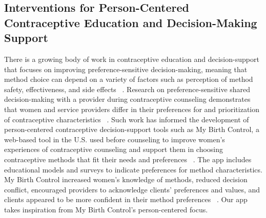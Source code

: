 \subsection{Interventions for Person-Centered Contraceptive Education and Decision-Making Support} 

There is a growing body of work in contraceptive education and decision-support that focuses on improving preference-sensitive decision-making, meaning that method choice can depend on a variety of factors such as perception of method safety, effectiveness, and side effects ~\cite{madden2015role, marshall2016young}. Research on preference-sensitive shared decision-making with a provider during contraceptive counseling demonstrates that women and service providers differ in their preferences for and prioritization of contraceptive characteristics ~\cite{weisberg2013women}. Such work has informed the development of person-centered contraceptive decision-support tools such as My Birth Control, a web-based tool in the U.S. used before counseling to improve women’s experiences of contraceptive counseling and support them in choosing contraceptive methods that fit their needs and preferences ~\cite{dehlendorf2019cluster}. The app includes educational models and surveys to indicate preferences for method characteristics. My Birth Control increased women’s knowledge of methods, reduced decision conflict, encouraged providers to acknowledge clients’ preferences and values, and clients appeared to be more confident in their method preferences ~\cite{holt2020patient, dehlendorf2019mixed}. Our app takes inspiration from My Birth Control’s person-centered focus. 



